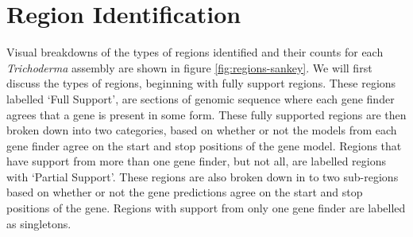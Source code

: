 \section{Region Identification}

Visual breakdowns of the types of regions identified and their counts
for each \textit{Trichoderma} assembly are shown in figure
\ref{fig:regions-sankey}. We will first discuss the types of regions,
beginning with fully support regions. These regions labelled `Full
Support', are sections of genomic sequence where each gene finder
agrees that a gene is present in some form. These fully supported
regions are then broken down into two categories, based on whether or
not the models from each gene finder agree on the start and stop
positions of the gene model. Regions that have support from more than
one gene finder, but not all, are labelled regions with `Partial
Support'. These regions are also broken down in to two sub-regions
based on whether or not the gene predictions agree on the start and
stop positions of the gene. Regions with support from only one gene
finder are labelled as singletons.

